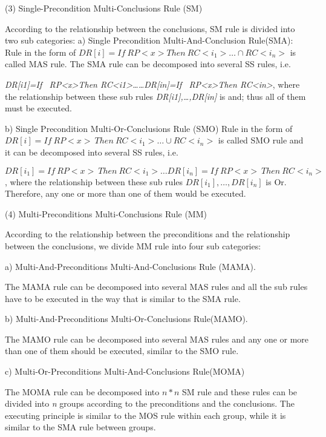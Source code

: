 \documentclass{elsarticle}
\begin{document}
(3) Single-Precondition Multi-Conclusions Rule (SM)


\textrm{According to the relationship between the conclusions, SM rule
is divided into two sub categories:}
a) Single Precondition Multi-And-Conclusion Rule(SMA): Rule
in the form of $DR[i] =If \  RP<x> Then \  RC<i_1>\ldots \cap RC<i_n>$
is called MAS rule. The SMA rule can be decomposed into several SS
rules, i.e.


\textrm{\textit{DR[i1]=If \ RP{\textless}x{\textgreater}Then
RC{\textless}i1{\textgreater}……DR[in]=If
\ RP{\textless}x{\textgreater}Then
RC{\textless}in{\textgreater}}}\textrm{, where the relationship between
these sub rules }\textrm{\textit{DR[i1],…,DR[in]}}\textrm{ is and; thus
all of them must be executed.}



b) Single Precondition Multi-Or-Conclusions Rule (SMO)
Rule in the form of $DR[i]=If \
RP<x>\ Then \
RC<i_1> \ldots\cup RC<i_n>$\textrm{
is called SMO rule and it can be decomposed into several SS rules,
i.e.}


$DR[i_1]=If \ RP<x> \ Then \
RC<i_1>\ldots DR[i_n]= If
\ RP<x>\ Then \
RC<i_n>$\textrm{, where the relationship between
these sub rules
}$DR[i_1],\ldots,DR[i_n]$
is Or. Therefore, any one or more than one of them would be executed.

{
(4) Multi-Preconditions Multi-Conclusions Rule (MM)}


\textrm{According to the relationship between the preconditions and the
relationship between the conclusions, we divide MM rule into four sub
categories:}


a) Multi-And-Preconditions Multi-And-Conclusions Rule (MAMA).


\textrm{The MAMA rule can be decomposed into several MAS rules and all
the sub rules have to be executed in the way that is similar to the SMA
rule.}


b) Multi-And-Preconditions Multi-Or-Conclusions Rule(MAMO).


\textrm{The MAMO rule can be decomposed into several MAS rules and any
one or more than one of them should be executed, similar to the SMO
rule.}

c) Multi-Or-Preconditions Multi-And-Conclusions Rule(MOMA)


\textrm{The MOMA rule can be decomposed into
}$n*n$\textrm{ SM rule and these rules can be divided
into }\textrm{\textit{n}}\textrm{ groups according to the preconditions
and the conclusions. The executing principle is similar to the MOS rule
within each group, while it is similar to the SMA rule between
groups.}
\end{document}
